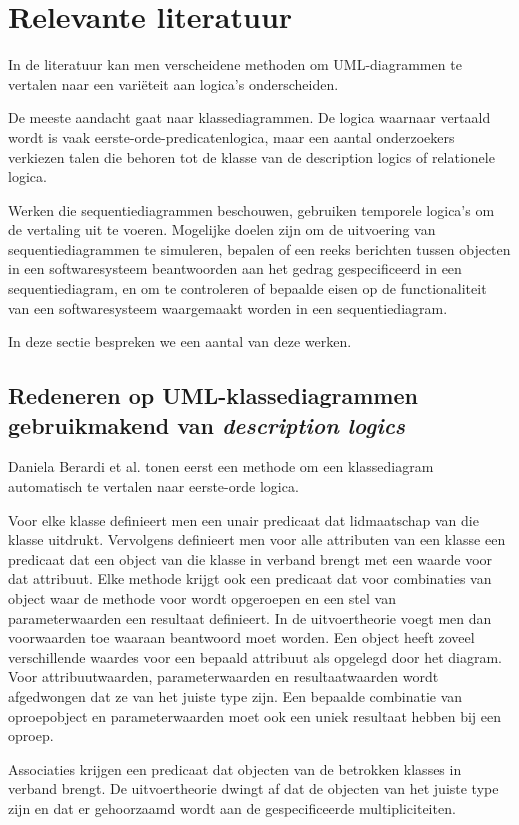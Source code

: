 \chapter{Relevante literatuur}\label{sec:literatuur}
In de literatuur kan men verscheidene methoden om UML-diagrammen te vertalen naar een vari\"eteit aan logica's onderscheiden.

De meeste aandacht gaat naar klassediagrammen. De logica waarnaar vertaald wordt is vaak eerste-orde-predicatenlogica, maar een aantal onderzoekers verkiezen talen die behoren tot de klasse van de description logics of relationele logica.

Werken die sequentiediagrammen beschouwen, gebruiken temporele logica's om de vertaling uit te voeren. Mogelijke doelen zijn om de uitvoering van sequentiediagrammen te simuleren, bepalen of een reeks berichten tussen objecten in een softwaresysteem beantwoorden aan het gedrag gespecificeerd in een sequentiediagram, en om te controleren of bepaalde eisen op de functionaliteit van een softwaresysteem waargemaakt worden in een sequentiediagram.

In deze sectie bespreken we een aantal van deze werken.

\section{Redeneren op UML-klassediagrammen gebruikmakend van \textit{description logics}}
Daniela Berardi et al.\cite{BerardiDaniela2005RoUc} tonen eerst een methode om een klassediagram automatisch te vertalen naar eerste-orde logica.

Voor elke klasse definieert men een unair predicaat dat lidmaatschap van die klasse uitdrukt. Vervolgens definieert men voor alle attributen van een klasse een predicaat dat een object van die klasse in verband brengt met een waarde voor dat attribuut. Elke methode krijgt ook een predicaat dat voor combinaties van object waar de methode voor wordt opgeroepen en een stel van parameterwaarden een resultaat definieert. In de uitvoertheorie voegt men dan voorwaarden toe waaraan beantwoord moet worden. Een object heeft zoveel verschillende waardes voor een bepaald attribuut als opgelegd door het diagram. Voor attribuutwaarden, parameterwaarden en resultaatwaarden wordt afgedwongen dat ze van het juiste type zijn. Een bepaalde combinatie van oproepobject en parameterwaarden moet ook een uniek resultaat hebben bij een oproep.

Associaties krijgen een predicaat dat objecten van de betrokken klasses in verband brengt. De uitvoertheorie dwingt af dat de objecten van het juiste type zijn en dat er gehoorzaamd wordt aan de gespecificeerde multipliciteiten.

